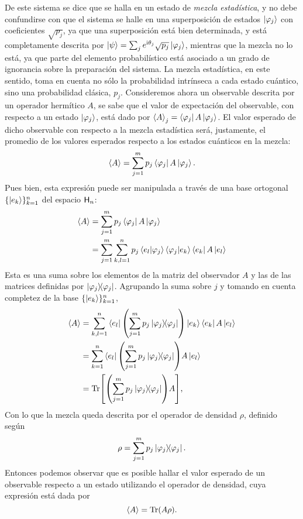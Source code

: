 De este sistema se dice que se halla en un estado de \textit{mezcla estadística}, y no debe confundirse con que el sistema se halle en una superposición de estados $\ket{\varphi_{j}}$ con coeficientes $\sqrt{p_{j}}$, ya que una superposición está bien determinada, y está completamente descrita por $\ket{\psi}=\sum_{j} e^{\text{i} \theta_j} \sqrt{p_{j}}\ket{\varphi_{j}}$, mientras que la mezcla no lo está, ya que parte del elemento probabilístico está asociado a un grado de ignorancia sobre la preparación del sistema. La mezcla estadística, en este sentido, toma en cuenta no sólo la probabilidad intrínseca a cada estado cuántico, sino una probabilidad clásica, $p_{j}$. Consideremos ahora un observable descrita por un operador hermítico $A$, se sabe que el valor de expectación del observable, con respecto a un estado $\ket{\varphi_{j}}$, está dado por $\expval{A}_{j}=\bra{\varphi_{j}}A\ket{\varphi_{j}}$. El valor esperado de dicho observable con respecto a la mezcla estadística será, justamente, el promedio de los valores esperados respecto a los estados cuánticos en la mezcla:
\begin{equation}
\expval{A}=\sum_{j=1}^{m}p_{j}\bra{\varphi_{j}}A\ket{\varphi_{j}}. \nonumber
\end{equation}
Pues bien, esta expresión puede ser manipulada a través de una base ortogonal $\{\ket{e_{k}}\}_{k=1}^{n}$ del espacio ${\sf H}_{n}$:
\begin{align}
\expval{A}&=\sum_{j=1}^{m}p_{j}\bra{\varphi_{j}}A\ket{\varphi_{j}}\nonumber\\ 
&=\sum_{j=1}^{m}\sum_{k,l=1}^{n}p_{j}\bra{e_{l}}\ket{\varphi_{j}}\bra{\varphi_{j}}\ket{e_{k}} \bra{e_{k}}A\ket{e_{l}} \nonumber
\end{align}
Esta es una suma sobre los elementos de la matriz del observador $A$ y las de las matrices definidas por $\dyad{\varphi_{j}}$. Agrupando la suma sobre $j$ y tomando en cuenta completez de la base $\{\ket{e_{k}}\}_{k=1}^{n}$,
\begin{align}
\expval{A}&=\sum_{k,l=1}^{n}\bra{e_{l}}\qty(\sum_{j=1}^{m}p_{j}\dyad{\varphi_{j}})\ket{e_{k}} \bra{e_{k}}A\ket{e_{l}}\nonumber\\
&=\sum_{k=1}^{n}\bra{e_{l}}\qty(\sum_{j=1}^{m}p_{j}\dyad{\varphi_{j}})A\ket{e_{l}}\nonumber\\
&=\Tr[\qty(\sum_{j=1}^{m}p_{j}\dyad{\varphi_{j}})A]\rlap{,}\nonumber
\end{align}
Con lo que la mezcla queda descrita por el operador de densidad $\rho$, definido según
\begin{equation}\label{eq:DensOpMix}
\rho=\sum_{j=1}^{m}p_{j}\dyad{\varphi_{j}}.
\end{equation}
Entonces podemos observar que es posible hallar el valor esperado de un observable respecto a un estado  utilizando el operador de densidad, cuya expresión está dada por
\begin{equation}\label{eq:ExpValFromDensOp}
\expval{A}=\Tr(A\rho).
\end{equation}

